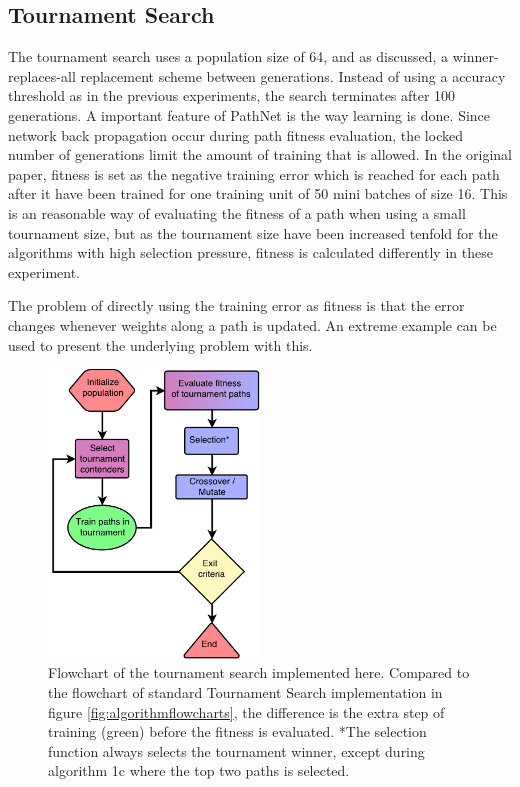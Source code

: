 \newpage

\subsection{Tournament Search}\label{exp2:implementation.search}
The tournament search uses a population size of 64, and as discussed, a winner-replaces-all replacement scheme between generations. Instead of using a accuracy threshold as in the previous experiments, the search terminates after 100 generations. A important feature of PathNet is the way learning is done. Since network back propagation occur during path fitness evaluation, the locked number of generations limit the amount of training that is allowed. In the original paper, fitness is set as the negative training error which is reached for each path after it have been trained for one training unit of 50 mini batches of size 16. This is an reasonable way of evaluating the fitness of a path when using a small tournament size, but as the tournament size have been increased tenfold for the algorithms with high selection pressure, fitness is calculated differently in these experiment. 

The problem of directly using the training error as fitness is that the error changes whenever weights along a path is updated. An extreme example can be used to present the underlying problem with this.

\begin{figure}[ht]
    \centering
    \includegraphics[width=0.5\textwidth]{Chapters/4.Experiments/exp2/figures/TS_implementation.pdf}
    \caption{Flowchart of the tournament search implemented here. Compared to the flowchart of standard Tournament Search implementation in figure \ref{fig:algorithmflowcharts}, the difference is the extra step of training (green) before the fitness is evaluated. *The selection function always selects the tournament winner, except during algorithm 1c where the top two paths is selected.}
    \label{fig:ts_flowchart}
\end{figure}


